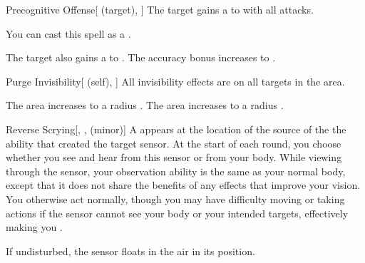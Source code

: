 \lowercase{\hypertarget{spell:Precognitive Offense}{}}\label{spell:Precognitive Offense}
\begin{attuneability}[Rank 3]{\hypertarget{spell:Precognitive Offense}{Precognitive Offense}}[ (target), ]
The target gains a   to  with all attacks.

You can cast this spell as a .

\rankline
{} The target also gains a   to .
 The accuracy bonus increases to .
\end{attuneability}
\vspace{0.25em}



\lowercase{\hypertarget{spell:Purge Invisibility}{}}\label{spell:Purge Invisibility}
\begin{attuneability}[Rank 3]{\hypertarget{spell:Purge Invisibility}{Purge Invisibility}}[ (self), ]
All invisibility effects are  on all targets in the area.

\rankline
{} The area increases to a \areahuge radius .
 The area increases to a \areaext radius .
\end{attuneability}
\vspace{0.25em}



\lowercase{\hypertarget{spell:Reverse Scrying}{}}\label{spell:Reverse Scrying}
\begin{freeability}[Rank 3]{\hypertarget{spell:Reverse Scrying}{Reverse Scrying}}[, ,  (minor)]
A  appears at the location of the source of the the ability that created the target sensor.
At the start of each round, you choose whether you see and hear from this sensor or from your body.
While viewing through the sensor, your observation ability is the same as your normal body, except that it does not share the benefits of any  effects that improve your vision.
You otherwise act normally, though you may have difficulty moving or taking actions if the sensor cannot see your body or your intended targets, effectively making you \blinded.

If undisturbed, the sensor floats in the air in its position.
\end{freeability}
\vspace{0.25em}



